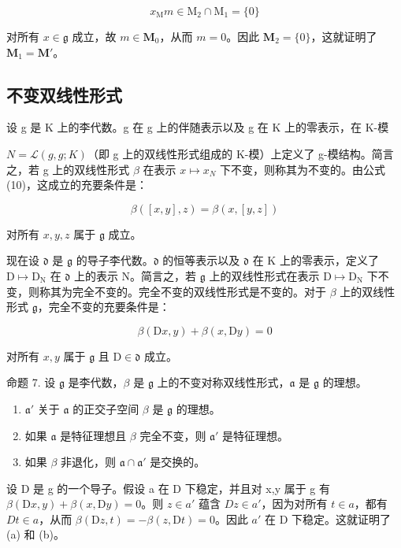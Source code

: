 \[
x _ {\mathrm{M}} m \in \mathrm{M} _ {2} \cap \mathrm{M} _ {1} = \{0 \}
\]

对所有 \(x \in \mathfrak{g}\) 成立，故 \(m \in \mathbf{M}_0\)，从而 \(m = 0\)。因此 \(\mathbf{M}_2 = \{0\}\)，这就证明了 \(\mathbf{M}_1 = \mathbf{M}'\)。

\subsection{不变双线性形式}

设 g 是 K 上的李代数。g 在 g 上的伴随表示以及 g 在 K 上的零表示，在 K-模

\(N = \mathcal{L}(g, g; K)\)（即 g 上的双线性形式组成的 K-模）上定义了 g-模结构。简言之，若 g 上的双线性形式 \(\beta\) 在表示 \(x \mapsto x_{N}\) 下不变，则称其为不变的。由公式 (10)，这成立的充要条件是：

\[
\beta ([ x, y ], z) = \beta (x, [ y, z ])\tag{13}
\]

对所有 \(x, y, z\) 属于 \(\mathfrak{g}\) 成立。

现在设 \(\mathfrak{d}\) 是 \(\mathfrak{g}\) 的导子李代数。\(\mathfrak{d}\) 的恒等表示以及 \(\mathfrak{d}\) 在 \(\mathrm{K}\) 上的零表示，定义了 \(\mathrm{D} \mapsto \mathrm{D}_{\mathrm{N}}\) 在 \(\mathfrak{d}\) 上的表示 \(\mathrm{N}\)。简言之，若 \(\mathfrak{g}\) 上的双线性形式在表示 \(\mathrm{D} \mapsto \mathrm{D}_{\mathrm{N}}\) 下不变，则称其为完全不变的。完全不变的双线性形式是不变的。对于 \(\beta\) 上的双线性形式 \(\mathfrak{g}\)，完全不变的充要条件是：

\[
\beta (\mathrm{D} x, y) + \beta (x, \mathrm{D} y) = 0\tag{14}
\]

对所有 \(x, y\) 属于 \(\mathfrak{g}\) 且 \(\mathrm{D} \in \mathfrak{d}\) 成立。

命题 7. 设 \(\mathfrak{g}\) 是李代数，\(\beta\) 是 \(\mathfrak{g}\) 上的不变对称双线性形式，\(\mathfrak{a}\) 是 \(\mathfrak{g}\) 的理想。

\begin{enumerate}
\def\labelenumi{(\alph{enumi})}
\item
  \(\mathfrak{a}'\) 关于 \(\mathfrak{a}\) 的正交子空间 \(\beta\) 是 \(\mathfrak{g}\) 的理想。
\item
  如果 \(\mathfrak{a}\) 是特征理想且 \(\beta\) 完全不变，则 \(\mathfrak{a}'\) 是特征理想。
\item
  如果 \(\beta\) 非退化，则 \(\mathfrak{a} \cap \mathfrak{a}'\) 是交换的。
\end{enumerate}

设 D 是 g 的一个导子。假设 a 在 D 下稳定，并且对 x,y 属于 g 有 \(\beta(\mathrm{D}x,y)+\beta(x,\mathrm{D}y)=0\)。则 \(z\in a'\) 蕴含 \(Dz\in a'\)，因为对所有 \(t\in a\)，都有 \(Dt\in a\)，从而 \(\beta(\mathrm{D}z,t)=-\beta(z,\mathrm{D}t)=0\)。因此 \(a'\) 在 D 下稳定。这就证明了 (a) 和 (b)。

